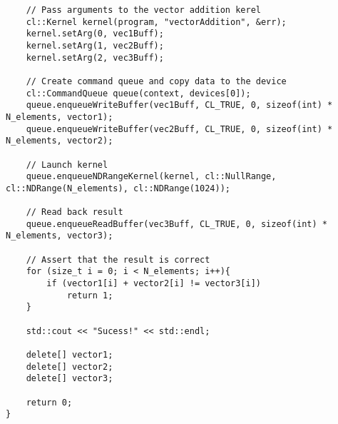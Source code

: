\begin{lstlisting}
	// Pass arguments to the vector addition kerel
	cl::Kernel kernel(program, "vectorAddition", &err);
	kernel.setArg(0, vec1Buff);
	kernel.setArg(1, vec2Buff);
	kernel.setArg(2, vec3Buff);
	
	// Create command queue and copy data to the device
	cl::CommandQueue queue(context, devices[0]);
	queue.enqueueWriteBuffer(vec1Buff, CL_TRUE, 0, sizeof(int) * N_elements, vector1);
	queue.enqueueWriteBuffer(vec2Buff, CL_TRUE, 0, sizeof(int) * N_elements, vector2);

	// Launch kernel
	queue.enqueueNDRangeKernel(kernel, cl::NullRange, cl::NDRange(N_elements), cl::NDRange(1024));

	// Read back result
	queue.enqueueReadBuffer(vec3Buff, CL_TRUE, 0, sizeof(int) * N_elements, vector3);

	// Assert that the result is correct
	for (size_t i = 0; i < N_elements; i++){
		if (vector1[i] + vector2[i] != vector3[i])
			return 1;
	}

	std::cout << "Sucess!" << std::endl;

	delete[] vector1;
	delete[] vector2;
	delete[] vector3;

	return 0;
}
\end{lstlisting}